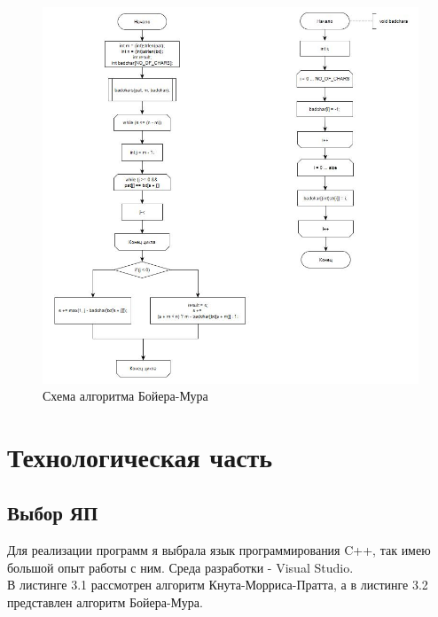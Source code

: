 \documentclass[12pt]{report}
\begin{document}
\begin{figure}[h]
        	\begin{center}
        		\includegraphics[scale=0.8]{2}
        		\caption{Схема алгоритма Бойера-Мура}
        		\label{fig:def}
        	\end{center}
        \end{figure}


\chapter{Технологическая часть}
\section{Выбор ЯП}
Для реализации программ я выбрала язык программирования C++, так имею большой опыт работы с ним. Среда разработки - Visual Studio. \\

В листинге 3.1 рассмотрен алгоритм Кнута-Морриса-Пратта, а в листинге 3.2 представлен алгоритм Бойера-Мура.\\
\end{document}
